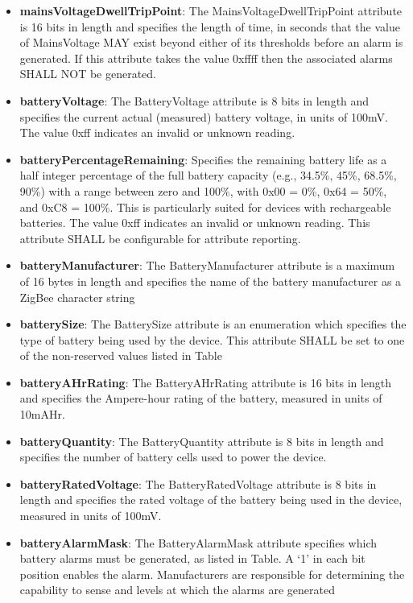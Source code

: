 \begin{itemize}
\item \textbf{mainsVoltageDwellTripPoint}: The MainsVoltageDwellTripPoint attribute is 16 bits in length and specifies the length of time, in seconds that the value of MainsVoltage MAY exist beyond either of its thresholds before an alarm is generated. If this attribute takes the value 0xffff then the associated alarms SHALL NOT be generated.
\item \textbf{batteryVoltage}: The BatteryVoltage attribute is 8 bits in length and specifies the current actual (measured) battery voltage, in units of 100mV. The value 0xff indicates an invalid or unknown reading.
\item \textbf{batteryPercentageRemaining}: Specifies the remaining battery life as a half integer percentage of the full battery capacity (e.g., 34.5\%, 45\%, 68.5\%, 90\%) with a range between zero and 100\%, with 0x00 = 0\%, 0x64 = 50\%, and 0xC8 = 100\%. This is particularly suited for devices with rechargeable batteries. The value 0xff indicates an invalid or unknown reading. This attribute SHALL be configurable for attribute reporting.
\item \textbf{batteryManufacturer}: The BatteryManufacturer attribute is a maximum of 16 bytes in length and specifies the name of the battery manufacturer as a ZigBee character string
\item \textbf{batterySize}: The BatterySize attribute is an enumeration which specifies the type of battery being used by the device. This attribute SHALL be set to one of the non-reserved values listed in Table
\item \textbf{batteryAHrRating}: The BatteryAHrRating attribute is 16 bits in length and specifies the Ampere-hour rating of the battery, measured in units of 10mAHr.
\item \textbf{batteryQuantity}: The BatteryQuantity attribute is 8 bits in length and specifies the number of battery cells used to power the device.
\item \textbf{batteryRatedVoltage}: The BatteryRatedVoltage attribute is 8 bits in length and specifies the rated voltage of the battery being used in the device, measured in units of 100mV.
\item \textbf{batteryAlarmMask}: The BatteryAlarmMask attribute specifies which battery alarms must be generated, as listed in Table. A ‘1’ in each bit position enables the alarm. Manufacturers are responsible for determining the capability to sense and levels at which the alarms are generated

\end{itemize}
